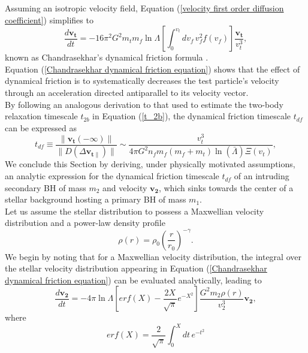 \documentclass[12pt,twoside,openany]{book}
\begin{document}
Assuming an isotropic velocity field, Equation (\ref{velocity first order diffusion coefficient}) simplifies to
\begin{equation}\label{Chandrasekhar dynamical friction equation}
    \frac{d\mathbf{v_t}}{dt}=-16\pi^2 G^2 m_t m_f\ln{\Lambda}\left[\int_{0}^{v_t}dv_f\, v_f^2 f(v_f)\right]\frac{\mathbf{v_t}}{v_t^3},
\end{equation}
known as Chandrasekhar's dynamical friction formula \parencite{Chandrasekhar_1943}.\\Equation (\ref{Chandrasekhar dynamical friction equation}) shows that the effect of dynamical friction is to systematically decreases the test particle's velocity through an acceleration directed antiparallel to its velocity vector.\\By following an analogous derivation to that used to estimate the two-body relaxation timescale $t_{2b}$ in Equation (\ref{t_2b}), the dynamical friction timescale $t_{df}$ can be expressed as
\begin{equation}
 t_{df}\equiv \frac{\|\mathbf{v_t}(-\infty)\|}{\|D(\Delta \mathbf{v_{t\parallel}})\|}\sim \frac{v_t^3}{4\pi G^2 n_fm_f(m_f+m_t)\ln{(\bar{\Lambda})}\Xi(v_t)},
\end{equation}
We conclude this Section by deriving, under physically motivated assumptions, an analytic expression for the dynamical friction timescale $t_{df}$ of an intruding secondary BH of mass $m_2$ and velocity $\mathbf{v_2}$, which sinks towards the center of a stellar background hosting a primary BH of mass $m_1$.\\Let us assume the stellar distribution to possess a Maxwellian velocity distribution and a power-law density profile
\begin{equation}\label{Power low distribution}
    \rho(r)=\rho_0\left(\frac{r}{r_0}\right)^{-\gamma}.
\end{equation}
We begin by noting that for a Maxwellian velocity distribution, the integral over the stellar velocity distribution appearing in Equation (\ref{Chandrasekhar dynamical friction equation}) can be evaluated analytically, leading to
\begin{equation}\label{Chandrasekhar dynamical friction equation for MB}
    \frac{d\mathbf{v_2}}{dt}=-4\pi \ln{\Lambda}\left[erf(X)-\frac{2X}{\sqrt{\pi}}e^{-X^2}\right]\frac{G^2m_2\rho(r)}{v_2^3}\mathbf{v_2},
\end{equation}
where 
\begin{equation}\label{error function}
    erf(X)=\frac{2}{\sqrt{\pi}}\int_{0}^{X}dt \, e^{-t^2}
\end{equation}
\end{document}
